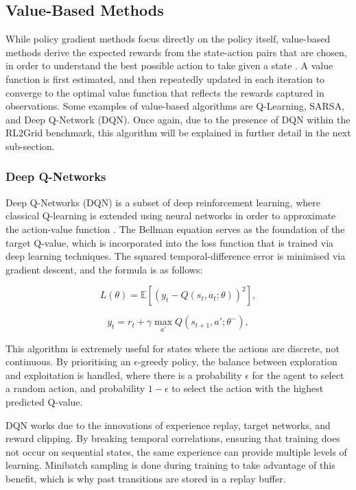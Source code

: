 \subsection{Value-Based Methods}

While policy gradient methods focus directly on the policy itself, value-based methods derive the expected rewards from the state-action pairs that are chosen, in order to understand the best possible action to take given a state \cite{yau2024interpretability}. A value function is first estimated, and then repeatedly updated in each iteration to converge to the optimal value function that reflects the rewards captured in observations. Some examples of value-based algorithms are Q-Learning, SARSA, and Deep Q-Network (DQN). Once again, due to the presence of DQN within the RL2Grid benchmark, this algorithm will be explained in further detail in the next sub-section.

\subsubsection{Deep Q-Networks}

Deep Q-Networks (DQN) is a subset of deep reinforcement learning, where classical Q-learning is extended using neural networks in order to approximate the action-value function \cite{mnih2013playing, van2016deep}. The Bellman equation serves as the foundation of the target Q-value, which is incorporated into the loss function that is trained via deep learning techniques. The squared temporal-difference error is minimised via gradient descent, and the formula \cite{ghasemi2024comprehensive} is as follows:

\begin{equation}
L(\theta) =
\mathbb{E}
\left[
\left(
y_t - Q(s_t,a_t;\theta)
\right)^2
\right] ,
\end{equation}

\begin{equation}
y_t =
r_t + \gamma \max_{a'} Q(s_{t+1},a';\theta^-),
\end{equation}

This algorithm is extremely useful for states where the actions are discrete, not continuous. By prioritising an $\epsilon$-greedy policy, the balance between exploration and exploitation is handled, where there is a probability $\epsilon$ for the agent to select a random action, and probability $1 - \epsilon$ to select the action with the highest predicted Q-value.

DQN works due to the innovations of experience replay, target networks, and reward clipping. By breaking temporal correlations, ensuring that training does not occur on sequential states, the same experience can provide multiple levels of learning. Minibatch sampling is done during training to take advantage of this benefit, which is why past transitions are stored in a replay buffer.

